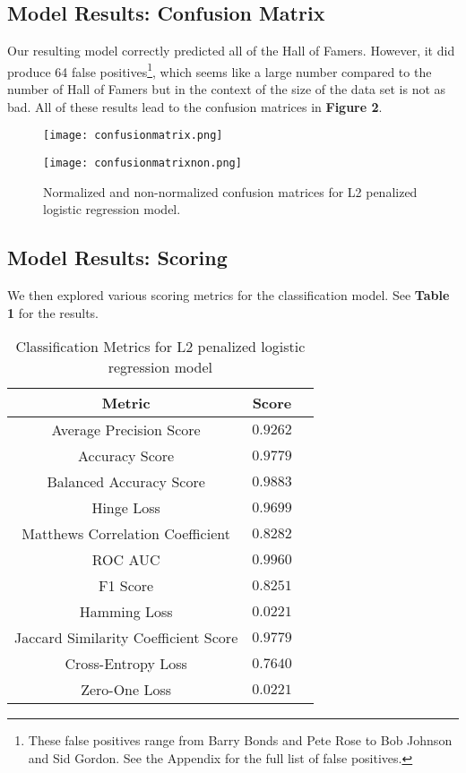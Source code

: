 \documentclass{sigkddExp}
\begin{document}
\subsection{Model Results: Confusion Matrix}
Our resulting model correctly predicted all of the Hall of Famers. However, it did produce 64 false positives\footnote{These false positives range from Barry Bonds and Pete Rose to Bob Johnson and Sid Gordon. See the Appendix for the full list of false positives.}, which seems like a large number compared to the number of Hall of Famers but in the context of the size of the data set is not as bad. All of these results lead to the confusion matrices in \textbf{Figure 2}.

\begin{figure}[htbp]
\begin{minipage}{.5\linewidth}
\texttt{[image: confusionmatrix.png]} 
\end{minipage}%
\begin{minipage}{.5\linewidth}
\texttt{[image: confusionmatrixnon.png]} 
\end{minipage}%
\caption{Normalized and non-normalized confusion matrices for L2 penalized logistic regression model.}
\end{figure}

\subsection{Model Results: Scoring}
We then explored various scoring metrics for the classification model. See \textbf{Table 1} for the results.

\begin{table}
\caption{Classification Metrics for L2 penalized logistic regression model}
\begin{tabular}{|c|c|l|} \hline
Metric&Score\\ \hline
Average Precision Score&$0.9262$\\ \hline
Accuracy Score&$0.9779$\\ \hline
Balanced Accuracy Score&$0.9883$\\ \hline
Hinge Loss&$0.9699$\\ \hline
Matthews Correlation Coefficient&$0.8282$\\ \hline
ROC AUC&$0.9960$\\ \hline
F1 Score&$0.8251$\\ \hline
Hamming Loss&$0.0221$\\ \hline
Jaccard Similarity Coefficient Score&$0.9779$\\ \hline
Cross-Entropy Loss&$0.7640$\\ \hline
Zero-One Loss&$0.0221$\\ \hline
\end{tabular}
\end{table}
\end{document}

